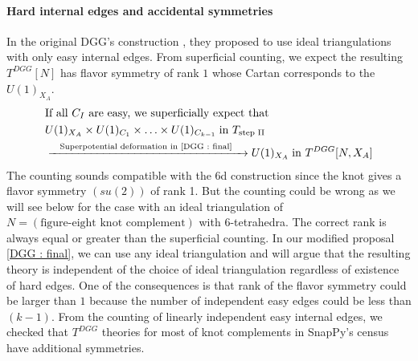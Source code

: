 \documentclass[a4paper,11pt]{article}
\begin{document}
\paragraph{Hard internal edges and accidental symmetries } In the original DGG's construction \cite{Dimofte:2011ju}, they proposed to use ideal triangulations with only easy internal edges. From superficial counting, we expect the resulting $T^{DGG}[N]$ has   flavor symmetry of rank $1$ whose Cartan corresponds to the $U(1)_{X_A}$.
%
\begin{align}
\begin{split}
&\textrm{If all $C_I$ are easy, we superficially expect that}
\\
&U(1)_{X_A} \times U(1)_{C_1}\times \ldots \times U(1)_{C_{k-1}} \; \textrm{in $T_{\textrm{step II}}$}
\\
&  \xrightarrow[]{\textrm{\quad Superpotential deformation in \eqref{DGG : final} \quad } }   U(1)_{X_A} \; \textrm{in $T^{DGG}[N,X_A]$}
\end{split}
\end{align}
%
The counting sounds compatible with the 6d construction since the knot gives a flavor symmetry $(su(2))$ of rank 1. But the counting  could be wrong as we will see below  for the case with an ideal triangulation of $N=(\textrm{figure-eight knot complement})$ with $6$-tetrahedra. The correct  rank is always equal or greater than the superficial counting.  
In our modified proposal \eqref{DGG : final}, we can use any ideal triangulation  and  will argue that the resulting  theory is independent of the choice of ideal triangulation regardless of existence of hard edges. One of the consequences is that  rank of the flavor symmetry could be larger than $1$ because the number of independent easy edges  could be less than $(k-1)$.  From the counting of linearly independent easy internal edges, we checked that $T^{DGG}$ theories for most of knot complements in SnapPy's census have additional symmetries. 
\end{document}
